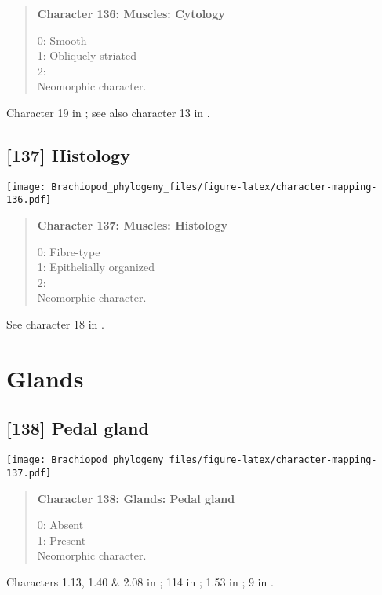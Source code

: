 \documentclass[openany]{book}
\theoremstyle{definition}
\theoremstyle{definition}
\theoremstyle{definition}
\theoremstyle{remark}
\begin{document}
\begin{quote}
\textbf{Character 136: Muscles: Cytology}

0: Smooth\\
1: Obliquely striated\\
2:\\
Neomorphic character.
\end{quote}

Character 19 in \citet{Haszprunar1996}; see also character 13 in
\citet{Haszprunar2000}.

\subsection*{{[}137{]} Histology}\label{histology}

\texttt{[image: Brachiopod\_phylogeny\_files/figure-latex/character-mapping-136.pdf]}

\begin{quote}
\textbf{Character 137: Muscles: Histology}

0: Fibre-type\\
1: Epithelially organized\\
2:\\
Neomorphic character.
\end{quote}

See character 18 in \citet{Haszprunar1996}.

\section{Glands}\label{glands}

\subsection*{{[}138{]} Pedal gland}\label{pedal-gland}

\texttt{[image: Brachiopod\_phylogeny\_files/figure-latex/character-mapping-137.pdf]}

\begin{quote}
\textbf{Character 138: Glands: Pedal gland}

0: Absent\\
1: Present\\
Neomorphic character.
\end{quote}

Characters 1.13, 1.40 \& 2.08 in \citet{Scheltema1993}; 114 in
\citet{Giribet2002}; 1.53 in \citet{SPS1996}; 9 in
\citet{Haszprunar1996}.
\end{document}
